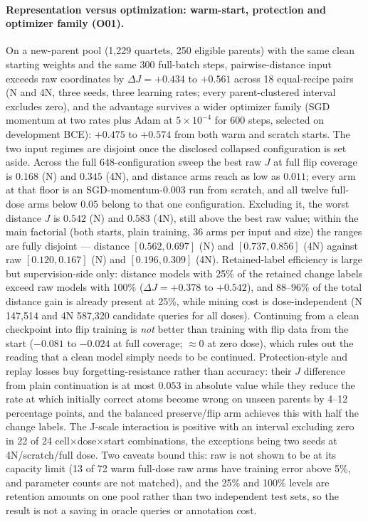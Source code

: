 \paragraph{Representation versus optimization: warm-start, protection and optimizer family (O01).} On a new-parent pool (1,229 quartets, 250 eligible parents) with the same clean starting weights and the same 300 full-batch steps, pairwise-distance input exceeds raw coordinates by $\Delta J=+0.434$ to $+0.561$ across 18 equal-recipe pairs (N and 4N, three seeds, three learning rates; every parent-clustered interval excludes zero), and the advantage survives a wider optimizer family (SGD momentum at two rates plus Adam at $5\times10^{-4}$ for 600 steps, selected on development BCE): $+0.475$ to $+0.574$ from both warm and scratch starts. The two input regimes are disjoint once the disclosed collapsed configuration is set aside. Across the full 648-configuration sweep the best raw $J$ at full flip coverage is $0.168$ (N) and $0.345$ (4N), and distance arms reach as low as $0.011$; every arm at that floor is an SGD-momentum-$0.003$ run from scratch, and all twelve full-dose arms below $0.05$ belong to that one configuration. Excluding it, the worst distance $J$ is $0.542$ (N) and $0.583$ (4N), still above the best raw value; within the main factorial (both starts, plain training, 36 arms per input and size) the ranges are fully disjoint --- distance $[0.562,0.697]$ (N) and $[0.737,0.856]$ (4N) against raw $[0.120,0.167]$ (N) and $[0.196,0.309]$ (4N). Retained-label efficiency is large but supervision-side only: distance models with 25\% of the retained change labels exceed raw models with 100\% ($\Delta J=+0.378$ to $+0.542$), and 88--96\% of the total distance gain is already present at 25\%, while mining cost is dose-independent (N 147,514 and 4N 587,320 candidate queries for all doses). Continuing from a clean checkpoint into flip training is \emph{not} better than training with flip data from the start ($-0.081$ to $-0.024$ at full coverage; $\approx0$ at zero dose), which rules out the reading that a clean model simply needs to be continued. Protection-style and replay losses buy forgetting-resistance rather than accuracy: their $J$ difference from plain continuation is at most $0.053$ in absolute value while they reduce the rate at which initially correct atoms become wrong on unseen parents by 4--12 percentage points, and the balanced preserve/flip arm achieves this with half the change labels. The J-scale interaction is positive with an interval excluding zero in 22 of 24 cell$\times$dose$\times$start combinations, the exceptions being two seeds at 4N/scratch/full dose. Two caveats bound this: raw is not shown to be at its capacity limit (13 of 72 warm full-dose raw arms have training error above 5\%, and parameter counts are not matched), and the 25\% and 100\% levels are retention amounts on one pool rather than two independent test sets, so the result is not a saving in oracle queries or annotation cost.
